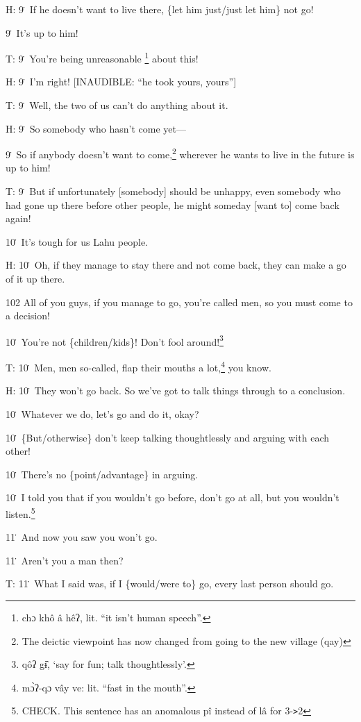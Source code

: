 H: 9\. If he doesn't want to live there, \{let him just/just let him\} not go!

9\. It's up to him!

T: 9\. You're being unreasonable \footnote{chɔ khô â hêʔ, lit. ``it isn't human speech''.} about this!

H: 9\. I'm right! [INAUDIBLE: ``he took yours, yours'']

T: 9\. Well, the two of us can't do anything about it.

H: 9\. So somebody who hasn't come yet---

9\. So if anybody doesn't want to come,\footnote{The deictic viewpoint has now changed from going to the new village (qay)} wherever he wants to live in the future
is up to him!

T: 9\. But if unfortunately [somebody] should be unhappy, even somebody who had
gone up there before other people, he might someday [want to] come back again!

10\. It's tough for us Lahu people.

H: 10\. Oh, if they manage to stay there and not come back, they can make a go
of it up there.

102 All of you guys, if you manage to go, you're called men, so you must come to
a decision!

10\. You're not \{children/kids\}! Don't fool around!\footnote{qôʔ gɨ̂, `say for fun; talk thoughtlessly'.}

T: 10\. Men, men so-called, flap their mouths a lot,\footnote{mɔ̀ʔ-qɔ vây ve: lit. ``fast in the mouth''.} you know.

H: 10\. They won't go back. So we've got to talk things through to a conclusion.

10\. Whatever we do, let's go and do it, okay?

10\. \{But/otherwise\} don't keep talking thoughtlessly and arguing with each other!

10\. There's no \{point/advantage\} in arguing.

10\. I told you that if you wouldn't go before, don't go at all, but you wouldn't
listen.\footnote{CHECK. This sentence has an anomalous pî instead of lâ for 3-\texttt{>}2}

11\. And now you saw you won't go.

11\. Aren't you a man then?

T: 11\. What I said was, if I \{would/were to\} go, every last person should go.


